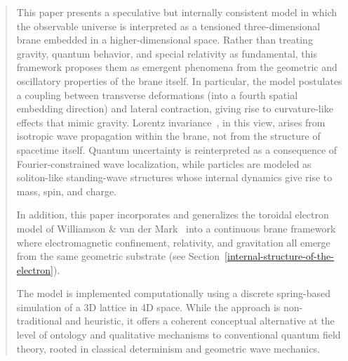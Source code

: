 \begin{abstract}
This paper presents a speculative but internally consistent model in
which the observable universe is interpreted as a tensioned
three-dimensional brane embedded in a higher-dimensional space. Rather
than treating gravity, quantum behavior, and special relativity as
fundamental, this framework proposes them as emergent phenomena from the
geometric and oscillatory properties of the brane itself. In particular,
the model postulates a coupling between transverse deformations (into a
fourth spatial embedding direction) and lateral contraction, giving rise to
curvature-like effects that mimic gravity. Lorentz invariance~\cite{Einstein1905,Rindler2006}, in this
view, arises from isotropic wave propagation within the brane, not from
the structure of spacetime itself. Quantum uncertainty is reinterpreted
as a consequence of Fourier-constrained wave localization, while
particles are modeled as soliton-like standing-wave structures whose
internal dynamics give rise to mass, spin, and charge.

In addition, this paper incorporates and generalizes the toroidal electron model
of Williamson \& van der Mark~\cite{Williamson1997} into a continuous brane framework
where electromagnetic confinement, relativity, and gravitation all emerge from the same
geometric substrate (see Section~\ref{internal-structure-of-the-electron}).

The model is implemented computationally using a discrete spring-based
simulation of a 3D lattice in 4D space. While the approach is
non-traditional and heuristic, it offers a coherent conceptual
alternative at the level of ontology and qualitative mechanisms to
conventional quantum field theory, rooted in classical determinism and
geometric wave mechanics.
\end{abstract}